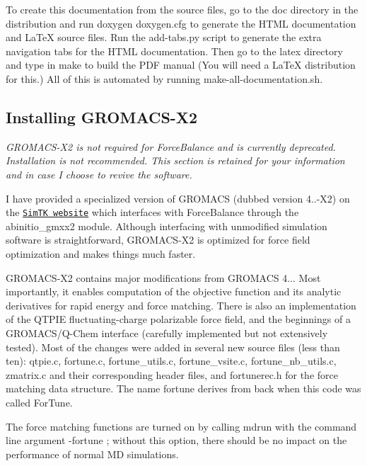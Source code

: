 To create this documentation from the source files, go to the {\ttfamily doc} directory in the distribution and run {\ttfamily  doxygen doxygen.\+cfg } to generate the H\+T\+ML documentation and La\+TeX source files. Run the {\ttfamily add-\/tabs.\+py} script to generate the extra navigation tabs for the H\+T\+ML documentation. Then go to the {\ttfamily latex} directory and type in {\ttfamily make} to build the P\+DF manual (You will need a La\+TeX distribution for this.) All of this is automated by running {\ttfamily make-\/all-\/documentation.\+sh}.\hypertarget{installation_install_gmxx2}{}\subsection{Installing G\+R\+O\+M\+A\+C\+S-\/\+X2}\label{installation_install_gmxx2}
{\itshape  G\+R\+O\+M\+A\+C\+S-\/\+X2 is not required for Force\+Balance and is currently deprecated. Installation is not recommended. This section is retained for your information and in case I choose to revive the software. }

I have provided a specialized version of G\+R\+O\+M\+A\+CS (dubbed version 4..-\/\+X2) on the \href{https://simtk.org/home/forcebalance/}{\tt Sim\+TK website} which interfaces with Force\+Balance through the abinitio\+\_\+gmxx2 module. Although interfacing with unmodified simulation software is straightforward, G\+R\+O\+M\+A\+C\+S-\/\+X2 is optimized for force field optimization and makes things much faster.

G\+R\+O\+M\+A\+C\+S-\/\+X2 contains major modifications from G\+R\+O\+M\+A\+CS 4... Most importantly, it enables computation of the objective function and its analytic derivatives for rapid energy and force matching. There is also an implementation of the Q\+T\+P\+IE fluctuating-\/charge polarizable force field, and the beginnings of a G\+R\+O\+M\+A\+C\+S/\+Q-\/\+Chem interface (carefully implemented but not extensively tested). Most of the changes were added in several new source files (less than ten)\+: {\ttfamily qtpie.\+c}, {\ttfamily fortune.\+c}, {\ttfamily fortune\+\_\+utils.\+c}, {\ttfamily fortune\+\_\+vsite.\+c}, {\ttfamily fortune\+\_\+nb\+\_\+utils.\+c}, {\ttfamily zmatrix.\+c} and their corresponding header files, and {\ttfamily fortunerec.\+h} for the force matching data structure. The name \textquotesingle{}fortune\textquotesingle{} derives from back when this code was called For\+Tune.

The force matching functions are turned on by calling {\ttfamily mdrun} with the command line argument {\ttfamily \textquotesingle{}-\/fortune\textquotesingle{}} ; without this option, there should be no impact on the performance of normal MD simulations.

